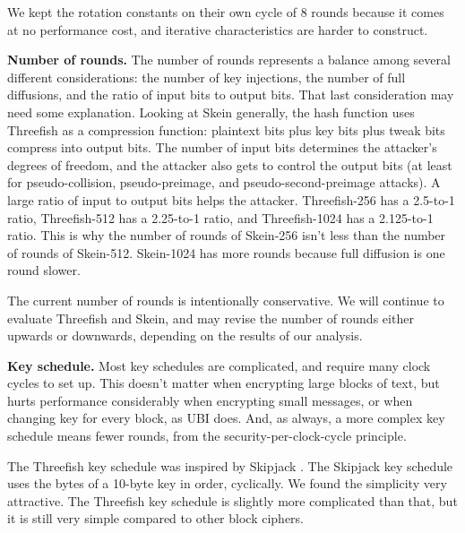 \documentclass[11pt,twoside]{article}
\begin{document}
We kept the rotation constants on their own cycle of 8 rounds because it comes at no performance cost, and iterative characteristics are harder to construct. 

{\bf Number of rounds.}  The number of rounds represents a balance among several different considerations: the number of key injections, the number of full diffusions, and the ratio of input bits to output bits.  That last consideration may need some explanation.  Looking at Skein generally, the hash function uses Threefish as a compression function: plaintext bits plus key bits plus tweak bits compress into output bits.  The number of input bits determines the attacker's degrees of freedom, and the attacker also gets to control the output bits (at least for pseudo-collision, pseudo-preimage, and pseudo-second-preimage attacks).  A large ratio of input to output bits helps the attacker.  Threefish-256 has a 2.5-to-1 ratio, Threefish-512 has a 2.25-to-1 ratio, and Threefish-1024 has a 2.125-to-1 ratio.  This is why the number of rounds of Skein-256 isn't less than the number of rounds of Skein-512.  Skein-1024 has more rounds because full diffusion is one round slower.

The current number of rounds is intentionally conservative.  We will continue to evaluate Threefish and Skein, and may revise the number of rounds either upwards or downwards, depending on the results of our analysis.

{\bf Key schedule.}  Most key schedules are complicated, and require many clock cycles to set up.  This doesn't matter when encrypting large blocks of text, but hurts performance considerably when encrypting small messages, or when changing key for every block, as UBI does.  And, as always, a more complex key schedule means fewer rounds, from the security-per-clock-cycle principle.

The Threefish key schedule was inspired by Skipjack \cite{Skipjack}.  The Skipjack key schedule uses the bytes of a 10-byte key in order, cyclically.  We found the simplicity very attractive.  The Threefish key schedule is slightly more complicated than that, but it is still very simple compared to other block ciphers.
\end{document}
